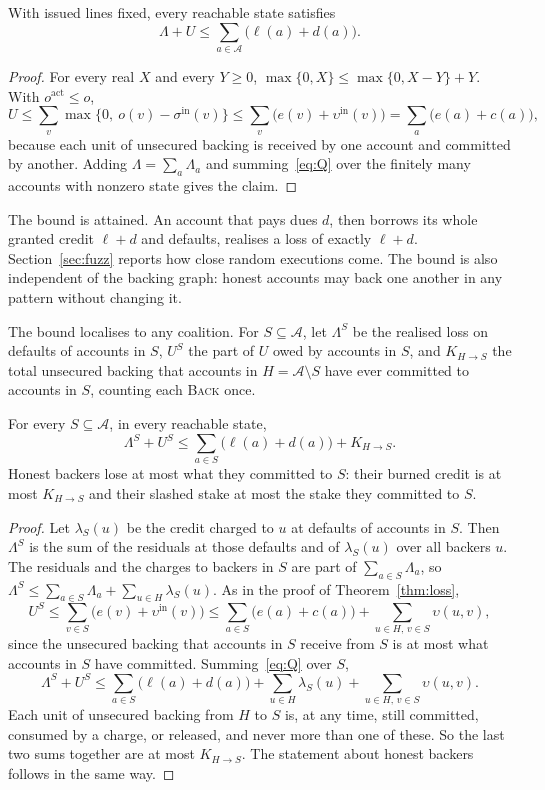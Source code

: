 \documentclass[acmsmall,nonacm,screen]{acmart}
\theoremstyle{acmdefinition}%
\newcommand{\A}{\mathcal{A}}
\newcommand{\sigin}{\sigma^{\mathrm{in}}}
\newcommand{\upsin}{\upsilon^{\mathrm{in}}}
\newcommand{\act}{\mathrm{act}}
\newcommand{\Op}[1]{\textsc{#1}}
\begin{document}
\begin{theorem}\label{thm:loss}
With issued lines fixed, every reachable state satisfies
\[
  \Lambda+U\le\sum_{a\in\A}\bigl(\ell(a)+d(a)\bigr).
\]
\end{theorem}

\begin{proof}
For every real $X$ and every $Y\ge0$, $\max\{0,X\}\le\max\{0,X-Y\}+Y$. With $o^{\act}\le o$,
\[
  U\le\sum_v\max\{0,\ o(v)-\sigin(v)\}\le\sum_v\bigl(e(v)+\upsin(v)\bigr)=\sum_a\bigl(e(a)+c(a)\bigr),
\]
because each unit of unsecured backing is received by one account and committed by another. Adding
$\Lambda=\sum_a\Lambda_a$ and summing~\eqref{eq:Q} over the finitely many accounts with nonzero
state gives the claim.
\end{proof}

The bound is attained. An account that pays dues $d$, then borrows its whole granted credit
$\ell+d$ and defaults, realises a loss of exactly $\ell+d$. Section~\ref{sec:fuzz} reports how close
random executions come. The bound is also independent of the backing graph: honest accounts may
back one another in any pattern without changing it.

The bound localises to any coalition. For $S\subseteq\A$, let $\Lambda^S$ be the realised loss on
defaults of accounts in $S$, $U^S$ the part of $U$ owed by accounts in $S$, and $K_{H\to S}$ the
total unsecured backing that accounts in $H=\A\setminus S$ have ever committed to accounts in $S$,
counting each \Op{Back} once.

\begin{corollary}[Coalitions]\label{cor:cut}
For every $S\subseteq\A$, in every reachable state,
\[
  \Lambda^S+U^S\le\sum_{a\in S}\bigl(\ell(a)+d(a)\bigr)+K_{H\to S}.
\]
Honest backers lose at most what they committed to $S$: their burned credit is at most $K_{H\to S}$
and their slashed stake at most the stake they committed to $S$.
\end{corollary}

\begin{proof}
Let $\lambda_S(u)$ be the credit charged to $u$ at defaults of accounts in $S$. Then $\Lambda^S$ is
the sum of the residuals at those defaults and of $\lambda_S(u)$ over all backers $u$. The residuals
and the charges to backers in $S$ are part of $\sum_{a\in S}\Lambda_a$, so
$\Lambda^S\le\sum_{a\in S}\Lambda_a+\sum_{u\in H}\lambda_S(u)$. As in the proof of
Theorem~\ref{thm:loss},
\[
  U^S\le\sum_{v\in S}\bigl(e(v)+\upsin(v)\bigr)\le\sum_{a\in S}\bigl(e(a)+c(a)\bigr)+\sum_{u\in H,\,v\in S}\upsilon(u,v),
\]
since the unsecured backing that accounts in $S$ receive from $S$ is at most what accounts in $S$
have committed. Summing~\eqref{eq:Q} over $S$,
\[
  \Lambda^S+U^S\le\sum_{a\in S}\bigl(\ell(a)+d(a)\bigr)+\sum_{u\in H}\lambda_S(u)+\sum_{u\in H,\,v\in S}\upsilon(u,v).
\]
Each unit of unsecured backing from $H$ to $S$ is, at any time, still committed, consumed by a
charge, or released, and never more than one of these. So the last two sums together are at most
$K_{H\to S}$. The statement about honest backers follows in the same way.
\end{proof}
\end{document}
